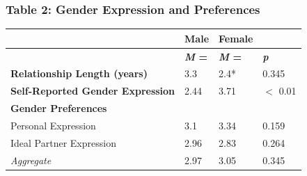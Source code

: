 \documentclass[twoside]{report}
\begin{document}
\hypertarget{table-2}
  {\subsubsection[Table 2: Gender Expression \texorpdfstring{\\}{} and Preferences]{Table 2: Gender Expression and Preferences}}

\begin{longtable}[]{@{}llll@{}}
 \toprule
                                          & \textbf{Male}       & \textbf{Female}      & \tabularnewline
 \midrule
 \endhead
                                          & \textbf{\emph{M} =} & \textbf{\emph{M} =~} &
 \emph{\textbf{p}}\tabularnewline
 \textbf{Relationship Length (years)}     & 3.3                 & 2.4*                 & 0.345\tabularnewline
 \textbf{Self-Reported Gender Expression} & 2.44                & 3.71                 & $<$ 0.01\tabularnewline
 \textbf{Gender Preferences}              &                     &                      & \tabularnewline
 Personal Expression                      & 3.1                 & 3.34                 & 0.159\tabularnewline
 Ideal Partner Expression                 & 2.96                & 2.83                 & 0.264\tabularnewline
 \emph{Aggregate}                         & 2.97                & 3.05                 & 0.345\tabularnewline
 \bottomrule
\end{longtable}
\end{document}
